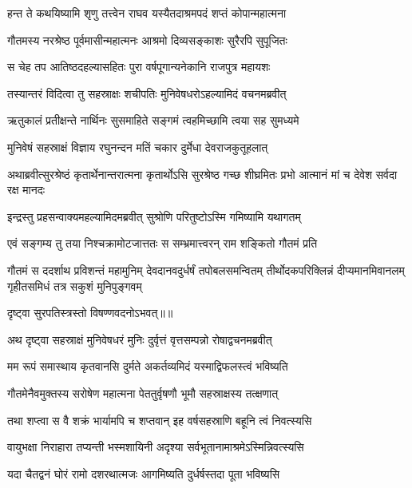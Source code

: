 \twolineshloka
{हन्त ते कथयिष्यामि शृणु तत्त्वेन राघव}
{यस्यैतदाश्रमपदं शप्तं कोपान्महात्मना} %

\twolineshloka
{गौतमस्य नरश्रेष्ठ पूर्वमासीन्महात्मनः}
{आश्रमो दिव्यसङ्काशः सुरैरपि सुपूजितः} %

\twolineshloka
{स चेह तप आतिष्ठदहल्यासहितः पुरा}
{वर्षपूगान्यनेकानि राजपुत्र महायशः} %

\twolineshloka
{तस्यान्तरं विदित्वा तु सहस्राक्षः शचीपतिः}
{मुनिवेषधरोऽहल्यामिदं वचनमब्रवीत्} %

\twolineshloka
{ऋतुकालं प्रतीक्षन्ते नार्थिनः सुसमाहिते}
{सङ्गमं त्वहमिच्छामि त्वया सह सुमध्यमे} %

\twolineshloka
{मुनिवेषं सहस्राक्षं विज्ञाय रघुनन्दन}
{मतिं चकार दुर्मेधा देवराजकुतूहलात्} %

\threelineshloka
{अथाब्रवीत्सुरश्रेष्ठं कृतार्थेनान्तरात्मना}
{कृतार्थोऽसि सुरश्रेष्ठ गच्छ शीघ्रमितः प्रभो}
{आत्मानं मां च देवेश सर्वदा रक्ष मानदः} %

\twolineshloka
{इन्द्रस्तु प्रहसन्वाक्यमहल्यामिदमब्रवीत्}
{सुश्रोणि परितुष्टोऽस्मि गमिष्यामि यथागतम्} %

\twolineshloka
{एवं सङ्गम्य तु तया निश्चक्रामोटजात्ततः}
{स सम्भ्रमात्त्वरन् राम शङ्कितो गौतमं प्रति} %

\fourlineshloka
{गौतमं स ददर्शाथ प्रविशन्तं महामुनिम्}
{देवदानवदुर्धर्षं तपोबलसमन्वितम्}
{तीर्थोदकपरिक्लिन्नं दीप्यमानमिवानलम्}
{गृहीतसमिधं तत्र सकुशं मुनिपुङ्गवम्} %

{दृष्ट्वा सुरपतिस्त्रस्तो विषण्णवदनोऽभवत्॥॥} %

\addtocounter{shlokacount}{1}

\twolineshloka
{अथ दृष्ट्वा सहस्राक्षं मुनिवेषधरं मुनिः}
{दुर्वृत्तं वृत्तसम्पन्नो रोषाद्वचनमब्रवीत्} %

\twolineshloka
{मम रूपं समास्थाय कृतवानसि दुर्मते}
{अकर्तव्यमिदं यस्माद्विफलस्त्वं भविष्यति} %

\twolineshloka
{गौतमेनैवमुक्तस्य सरोषेण महात्मना}
{पेततुर्वृषणौ भूमौ सहस्राक्षस्य तत्क्षणात्} %

\twolineshloka
{तथा शप्त्वा स वै शक्रं भार्यामपि च शप्तवान्}
{इह वर्षसहस्राणि बहूनि त्वं निवत्स्यसि} %

\twolineshloka
{वायुभक्षा निराहारा तप्यन्ती भस्मशायिनी}
{अदृश्या सर्वभूतानामाश्रमेऽस्मिन्निवत्स्यसि} %

\twolineshloka
{यदा चैतद्वनं घोरं रामो दशरथात्मजः}
{आगमिष्यति दुर्धर्षस्तदा पूता भविष्यसि} %

